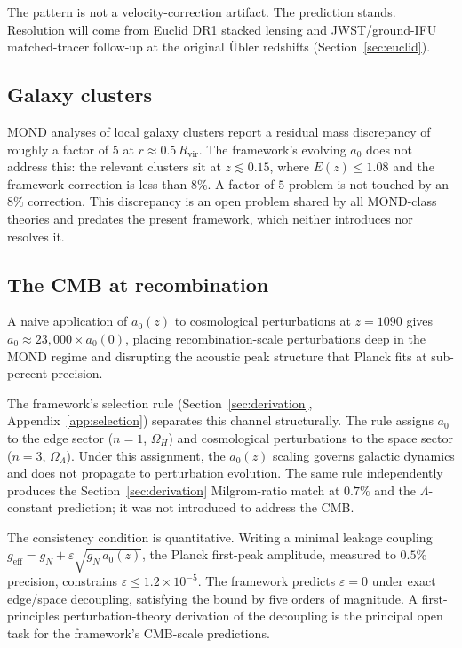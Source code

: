 \documentclass[11pt,a4paper]{article}
\numberwithin{equation}{section}
\numberwithin{table}{section}
\numberwithin{figure}{section}
\newcommand{\afid}{a_0}
\newcommand{\geff}{g_\text{eff}}
\newcommand{\gN}{g_N}
\newcommand{\Ez}{E(z)}
\newcommand{\Rvir}{R_\text{vir}}
\begin{document}
The pattern is not a velocity-correction artifact. The
prediction stands. Resolution will come from Euclid DR1 stacked lensing
and JWST/ground-IFU matched-tracer follow-up at the original {\"U}bler
redshifts (Section~\ref{sec:euclid}).

\subsection{Galaxy clusters}
\label{sec:clusters}

MOND analyses of local galaxy clusters \citep{Pointecouteau2005} report
a residual mass discrepancy of roughly a factor of $5$ at
$r \approx 0.5\,\Rvir$. The framework's evolving $\afid$ does not
address this: the relevant clusters sit at $z \lesssim 0.15$, where
$\Ez \leq 1.08$ and the framework correction is less than $8\%$. A
factor-of-$5$ problem is not touched by an $8\%$ correction. This
discrepancy is an open problem shared by all MOND-class theories
\citep{Sanders2003,Angus2008,Famaey2012} and predates the present
framework, which neither introduces nor resolves it.

\newpage

\subsection{The CMB at recombination}
\label{sec:cmb}

A naive application of $\afid(z)$ to cosmological perturbations at
$z = 1090$ gives $\afid \approx 23{,}000 \times \afid(0)$, placing
recombination-scale perturbations deep in the MOND regime and
disrupting the acoustic peak structure that Planck fits at sub-percent
precision.

The framework's selection rule (Section~\ref{sec:derivation},
Appendix~\ref{app:selection}) separates this channel structurally. The
rule assigns $\afid$ to the edge sector ($n = 1$, $\Omega_H$) and
cosmological perturbations to the space sector ($n = 3$,
$\Omega_\Lambda$). Under this assignment, the $\afid(z)$ scaling
governs galactic dynamics and does not propagate to perturbation
evolution. The same rule independently produces the
Section~\ref{sec:derivation} Milgrom-ratio match at $0.7\%$ and the
$\Lambda$-constant prediction; it was not introduced to address the
CMB.

The consistency condition is quantitative. Writing a minimal leakage
coupling $\geff = \gN + \varepsilon\sqrt{\gN\,\afid(z)}$, the Planck
first-peak amplitude, measured to $0.5\%$ precision, constrains
$\varepsilon \leq 1.2 \times 10^{-5}$. The framework predicts
$\varepsilon = 0$ under exact edge/space decoupling, satisfying the
bound by five orders of magnitude. A first-principles perturbation-theory
derivation of the decoupling is the principal open task for the
framework's CMB-scale predictions.
\end{document}
